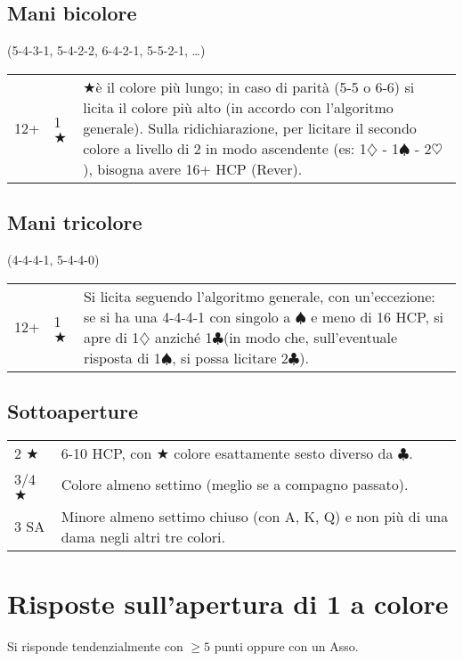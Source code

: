 \documentclass[a4paper,10pt]{article}
\renewcommand{\c}{$\clubsuit$\xspace}
\renewcommand{\d}{$\diamondsuit$\xspace}
\newcommand{\h}{$\heartsuit$\xspace}
\newcommand{\s}{$\spadesuit$\xspace}
\renewcommand{\j}{$\bigstar$\xspace}
\newcommand{\sa}{SA\xspace}
\newcommand{\smallspace}{\vskip0.3cm}
\newenvironment{twocol}
  {\smallspace\noindent\begin{tabular}{l p{0.8\textwidth}}}
  {\end{tabular}\smallspace}
\newenvironment{threecol}
  {\smallspace\noindent\begin{tabular}{l l p{0.7\textwidth}}}
  {\end{tabular}\smallspace}
\begin{document}
\subsection{Mani bicolore}
(5-4-3-1, 5-4-2-2, 6-4-2-1, 5-5-2-1, \dots)

\begin{threecol}
 12+ & 1 \j & \j \`e il colore pi\`u lungo; in caso di parit\`a (5-5 o 6-6) si licita il colore pi\`u alto (in accordo con l'algoritmo generale). Sulla ridichiarazione, per licitare il secondo colore a livello di 2 in modo ascendente (es: 1\d{} - 1\s{} - 2\h), bisogna avere 16+ HCP (Rever).
\end{threecol}


\subsection{Mani tricolore}
(4-4-4-1, 5-4-4-0)

\begin{threecol}
 12+ & 1 \j & Si licita seguendo l'algoritmo generale, con un'eccezione: se si ha una 4-4-4-1 con singolo a \s e meno di 16 HCP, si apre di 1\d anzich\'e 1\c (in modo che, sull'eventuale risposta di 1\s, si possa licitare 2\c).
\end{threecol}


\subsection{Sottoaperture}

\begin{twocol}
 2 \j & 6-10 HCP, con \j colore esattamente sesto diverso da \c.\\
 3/4 \j & Colore almeno settimo (meglio se a compagno passato).\\
 3 \sa & Minore almeno settimo chiuso (con A, K, Q) e non pi\`u di una dama negli altri tre colori.
\end{twocol}



\pagebreak

\section{Risposte sull'apertura di 1 a colore}

Si risponde tendenzialmente con $\geq 5$ punti oppure con un Asso.
\end{document}
